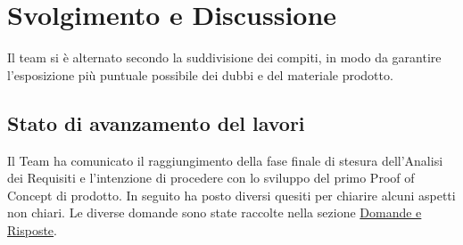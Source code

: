 \documentclass[a4paper,12pt]{article}
\begin{document}
\vspace{0.5cm}

\section{Svolgimento e Discussione}
Il team si è alternato secondo la suddivisione dei compiti, in modo da garantire l'esposizione più puntuale possibile dei dubbi e del materiale prodotto.

\subsection{Stato di avanzamento del lavori}
Il Team ha comunicato il raggiungimento della fase finale di stesura dell'Analisi dei Requisiti e l'intenzione di procedere con lo sviluppo del primo Proof of Concept di prodotto. In seguito ha posto diversi quesiti per chiarire alcuni aspetti non chiari. Le diverse domande sono state raccolte nella sezione \hyperref[qa]{Domande e Risposte}.
\end{document}
